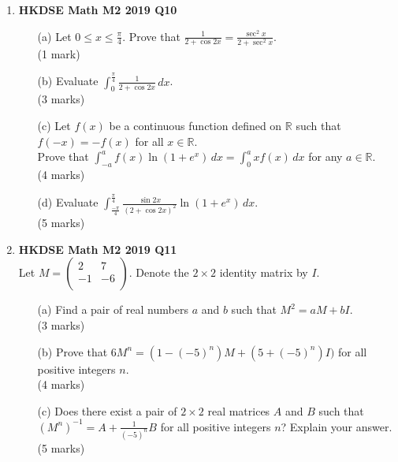 \documentclass[12pt]{article}
\begin{document}
\begin{enumerate}
	\item \textbf{HKDSE Math M2 2019 Q10}
	\begin{enumerate}
		\item [(a)] Let $0 \leq x \leq \displaystyle\frac{\pi}{4}$. Prove that $\displaystyle\frac{1}{2+\cos{2x}} = \frac{\sec^2{x}}{2+\sec^2{x}}$. \\(1 mark) 
		\item [(b)] Evaluate $\displaystyle \int_{0}^{ \frac{\pi}{4}} \frac{1}{2+\cos{2x}}\,dx$. \\(3 marks)
		\item [(c)] Let $f(x)$ be a continuous function defined on $\mathbb{R}$ such that $f(-x) = -f(x)$ for all $x \in \mathbb{R}$. \\Prove that $\displaystyle\int_{-a}^{a} f(x)\ln{(1+e^x)}\,dx = \int_{0}^{a} xf(x)\,dx$ for any $a \in \mathbb{R}  $. \\(4 marks)
		\item [(d)] Evaluate $\displaystyle \int_{ \frac{-\pi}{4}}^{ \frac{\pi}{4}}  \frac{\sin{2x}}{(2+\cos{2x})^2}\ln(1 + e^x)\,dx$. \\(5 marks)
	\end{enumerate}


	\item \textbf{HKDSE Math M2 2019 Q11}\\
	Let $M = \begin{pmatrix}
		2 &7 \\
		-1&-6\\
	\end{pmatrix}$. Denote the $2 \times2$ identity matrix by $I$. 
	\begin{enumerate}
		\item[(a)]Find a pair of real numbers $a$ and $b$ such that $M^2 = aM + bI$. \\(3 marks) 
		\item[(b)]
		Prove that $6M^n = (1-(-5)^n)M+(5+(-5)^n)I)$ for all positive integers $n$. \\(4 marks)
		\item[(c)]Does there exist a pair of $2\times2$ real matrices $A$ and $B$ such that $(M^n)^{-1} = A +\displaystyle \frac{1}{(-5)^n}B$ for all positive integers $n$? Explain your answer. \\(5 marks)
	\end{enumerate}



\end{enumerate}
\end{document}
